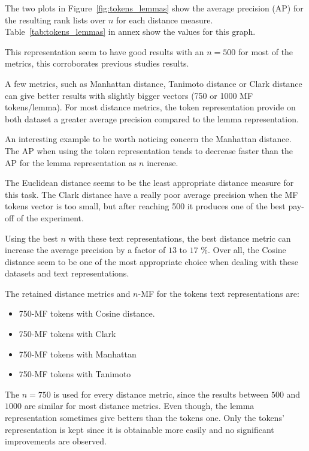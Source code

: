 The two plots in Figure~\ref{fig:tokens_lemmas} show the average precision (AP) for the resulting rank lists over $n$ for each distance measure.
Table~\ref{tab:tokens_lemmas} in annex show the values for this graph.

This representation seem to have good results with an $n=500$ for most of the metrics, this corroborates previous studies results.

A few metrics, such as Manhattan distance, Tanimoto distance or Clark distance can give better results with slightly bigger vectors (750 or 1000 MF tokens/lemma).
For most distance metrics, the token representation provide on both dataset a greater average precision compared to the lemma representation.

An interesting example to be worth noticing concern the Manhattan distance.
The AP when using the token representation tends to decrease faster than the AP for the lemma representation as $n$ increase.

The Euclidean distance seems to be the least appropriate distance measure for this task.
The Clark distance have a really poor average precision when the MF tokens vector is too small, but after reaching 500 it produces one of the best pay-off of the experiment.

Using the best $n$ with these text representations, the best distance metric can increase the average precision by a factor of $13$ to $17$ \%.
Over all, the Cosine distance seem to be one of the most appropriate choice when dealing with these datasets and text representations.

The retained distance metrics and $n$-MF for the tokens text representations are:
\begin{itemize}
  \item 750-MF tokens with Cosine distance.
  \item 750-MF tokens with Clark
  \item 750-MF tokens with Manhattan
  \item 750-MF tokens with Tanimoto
\end{itemize}

The $n = 750$ is used for every distance metric, since the results between $500$ and $1000$ are similar for most distance metrics.
Even though, the lemma representation sometimes give betters than the tokens one.
Only the tokens' representation is kept since it is obtainable more easily and no significant improvements are observed.

